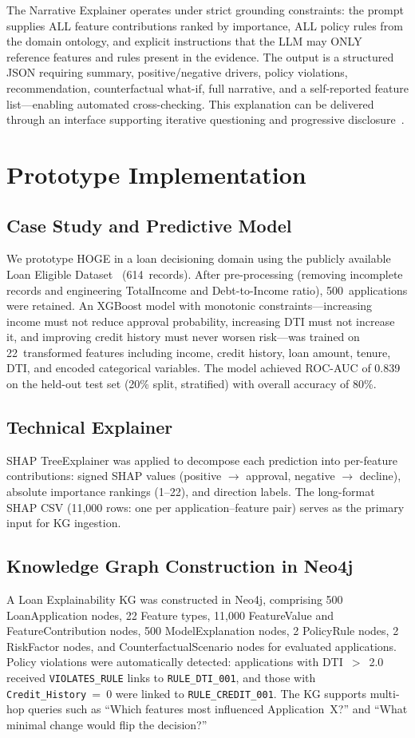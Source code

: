 \documentclass[lnbip]{svmultln}
\begin{document}
The Narrative Explainer operates under strict grounding constraints: the prompt supplies ALL feature contributions ranked by importance, ALL policy rules from the domain ontology, and explicit instructions that the LLM may ONLY reference features and rules present in the evidence. The output is a structured JSON requiring summary, positive/negative drivers, policy violations, recommendation, counterfactual what-if, full narrative, and a self-reported feature list---enabling automated cross-checking. This explanation can be delivered through an interface supporting iterative questioning and progressive disclosure~\cite{miller2019}.

\section{Prototype Implementation}

\subsection{Case Study and Predictive Model}
We prototype HOGE in a loan decisioning domain using the publicly available Loan Eligible Dataset~\cite{kaggle_loan} (614~records). After pre-processing (removing incomplete records and engineering TotalIncome and Debt-to-Income ratio), 500~applications were retained. An XGBoost model with monotonic constraints---increasing income must not reduce approval probability, increasing DTI must not increase it, and improving credit history must never worsen risk---was trained on 22~transformed features including income, credit history, loan amount, tenure, DTI, and encoded categorical variables. The model achieved ROC-AUC of 0.839 on the held-out test set (20\% split, stratified) with overall accuracy of 80\%.


\subsection{Technical Explainer}
SHAP TreeExplainer was applied to decompose each prediction into per-feature contributions: signed SHAP values (positive $\rightarrow$ approval, negative $\rightarrow$ decline), absolute importance rankings (1--22), and direction labels. The long-format SHAP CSV (11,000 rows: one per application--feature pair) serves as the primary input for KG ingestion.

\subsection{Knowledge Graph Construction in Neo4j}
A Loan Explainability KG was constructed in Neo4j, comprising 500 LoanApplication nodes, 22 Feature types, 11,000 FeatureValue and FeatureContribution nodes, 500 ModelExplanation nodes, 2 PolicyRule nodes, 2 RiskFactor nodes, and CounterfactualScenario nodes for evaluated applications. Policy violations were automatically detected: applications with DTI~$>$~2.0 received \texttt{VIOLATES\_RULE} links to \texttt{RULE\_DTI\_001}, and those with \texttt{Credit\_History}~=~0 were linked to \texttt{RULE\_CREDIT\_001}. The KG supports multi-hop queries such as ``Which features most influenced Application~X?'' and ``What minimal change would flip the decision?''
\end{document}
